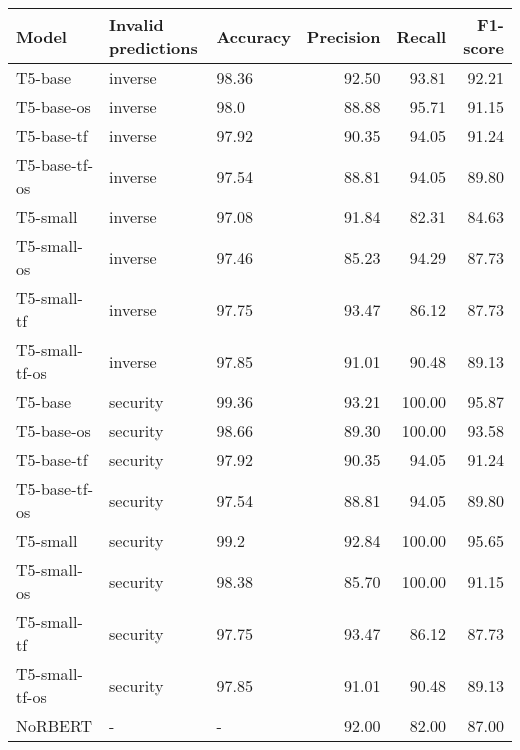 \begin{tabular}{lllrrr}
\toprule
         Model & Invalid predictions & Accuracy &  Precision &  Recall &  F1-score \\
\midrule
       T5-base &             inverse &    98.36 &      92.50 &   93.81 &     92.21 \\
    T5-base-os &             inverse &     98.0 &      88.88 &   95.71 &     91.15 \\
    T5-base-tf &             inverse &    97.92 &      90.35 &   94.05 &     91.24 \\
 T5-base-tf-os &             inverse &    97.54 &      88.81 &   94.05 &     89.80 \\
      T5-small &             inverse &    97.08 &      91.84 &   82.31 &     84.63 \\
   T5-small-os &             inverse &    97.46 &      85.23 &   94.29 &     87.73 \\
   T5-small-tf &             inverse &    97.75 &      93.47 &   86.12 &     87.73 \\
T5-small-tf-os &             inverse &    97.85 &      91.01 &   90.48 &     89.13 \\
       T5-base &            security &    99.36 &      93.21 &  100.00 &     95.87 \\
    T5-base-os &            security &    98.66 &      89.30 &  100.00 &     93.58 \\
    T5-base-tf &            security &    97.92 &      90.35 &   94.05 &     91.24 \\
 T5-base-tf-os &            security &    97.54 &      88.81 &   94.05 &     89.80 \\
      T5-small &            security &     99.2 &      92.84 &  100.00 &     95.65 \\
   T5-small-os &            security &    98.38 &      85.70 &  100.00 &     91.15 \\
   T5-small-tf &            security &    97.75 &      93.47 &   86.12 &     87.73 \\
T5-small-tf-os &            security &    97.85 &      91.01 &   90.48 &     89.13 \\
       NoRBERT &                   - &        - &      92.00 &   82.00 &     87.00 \\
\bottomrule
\end{tabular}
